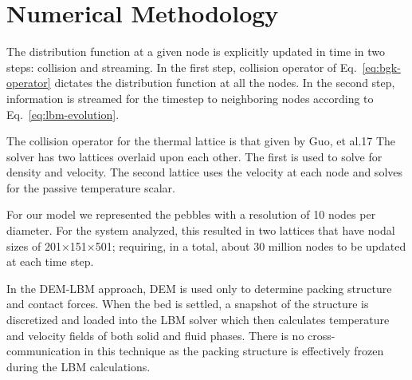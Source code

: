 \section{Numerical Methodology}

The distribution function at a given node is explicitly updated in time in two steps: collision and streaming. In the first step, collision operator of Eq.~\ref{eq:bgk-operator} dictates the distribution function at all the nodes. In the second step, information is streamed for the timestep to neighboring nodes according to Eq.~\ref{eq:lbm-evolution}.

The collision operator for the thermal lattice is that given by Guo, et al.17 The solver has two lattices overlaid upon each other. The first is used to solve for density and velocity. The second lattice uses the velocity at each node and solves for the passive temperature scalar. 

For our model we represented the pebbles with a resolution of 10 nodes per diameter. For the system analyzed, this resulted in two lattices that have nodal sizes of 201×151×501; requiring, in a total, about 30 million nodes to be updated at each time step.

In the DEM-LBM approach, DEM is used only to determine packing structure and contact forces. When the bed is settled, a snapshot of the structure is discretized and loaded into the LBM solver which then calculates temperature and velocity fields of both solid and fluid phases. There is no cross-communication in this technique as the packing structure is effectively frozen during the LBM calculations.
